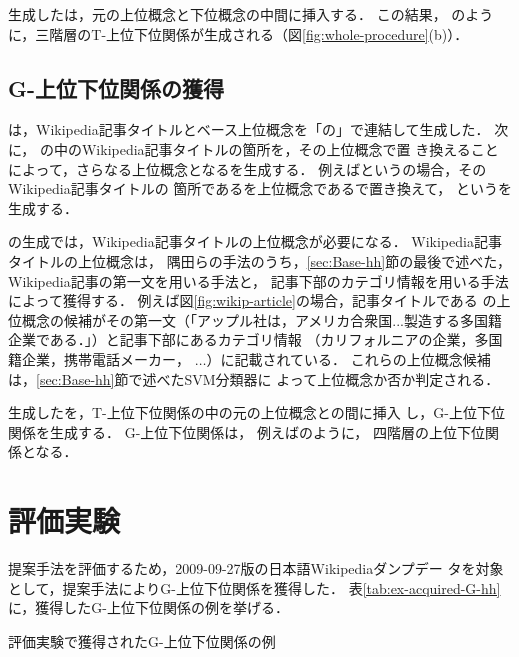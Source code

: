 \documentclass[japanese]{jnlp_1.4}
\newcommand{\thype}{}
\newcommand{\ghype}{}
\newcommand{\xmp}[1]{}
\newcommand{\isaThree}[3]{}
\newcommand{\isaFour}[4]{}
\begin{document}
生成した\thype{}は，元の上位概念と下位概念の中間に挿入する．
この結果，
\isaThree{作品}{黒澤明の作品}{七人の侍}のように，三階層のT-上位下位関係が生成される（図\ref{fig:whole-procedure}(b)）．


\subsection{G-上位下位関係の獲得
\label{sec:G-hh}}

\thype{}は，Wikipedia記事タイトルとベース上位概念を「の」で連結して生成した．
次に，
\thype{}の中のWikipedia記事タイトルの箇所を，その上位概念で置
き換えることによって，さらなる上位概念となる\ghype{}を生成する．
例えば\xmp{黒澤明の作品}という\thype{}の場合，そのWikipedia記事タイトルの
箇所である\xmp{黒澤明}を上位概念である\xmp{映画監督}で置き換えて，
\xmp{映画監督の作品}という\ghype{}を生成する．

\ghype{}の生成では，Wikipedia記事タイトルの上位概念が必要になる．
Wikipedia記事タイトルの上位概念は，
隅田らの手法のうち，\ref{sec:Base-hh}節の最後で述べた，
Wikipedia記事の第一文を用いる手法と，
記事下部のカテゴリ情報を用いる手法によって獲得する．
例えば図\ref{fig:wikip-article}の場合，記事タイトルである
\xmp{アップル　インコーポレイテッド}の上位概念の候補がその第一文（「アップル社は，アメリカ合衆国...製造する多国籍企業である．」）と記事下部にあるカテゴリ情報
（カリフォルニアの企業，多国籍企業，携帯電話メーカー，
$\ldots$）に記載されている．
これらの上位概念候補は，\ref{sec:Base-hh}節で述べたSVM分類器に
よって上位概念か否か判定される．

生成した\ghype{}を，T-上位下位関係の中の元の上位概念と\thype{}の間に挿入
し，G-上位下位関係を生成する．
G-上位下位関係は，
例えば\isaFour{作品}{映画監督の作品}{黒澤明の作品}{七人の侍}のように，
四階層の上位下位関係となる．



\section{評価実験 \label{sec:evaluation}}

提案手法を評価するため，2009-09-27版の日本語Wikipediaダンプデー
タを対象として，提案手法によりG-上位下位関係を獲得した．
表\ref{tab:ex-acquired-G-hh}に，獲得したG-上位下位関係の例を挙げる．

\begin{table}[b]
\caption{評価実験で獲得されたG-上位下位関係の例}
\label{tab:ex-acquired-G-hh}

\end{table}
\end{document}
